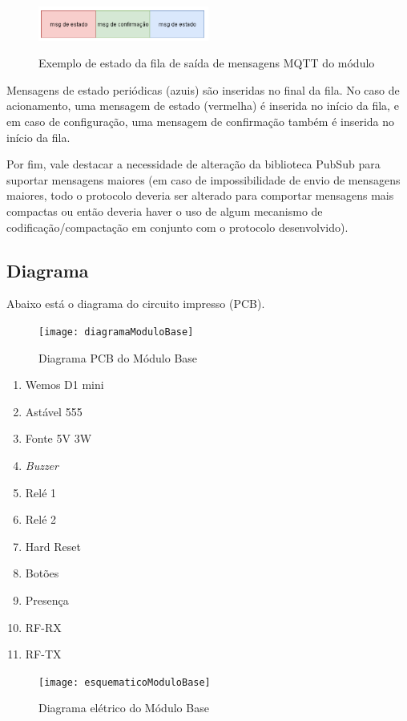 \begin{figure}[H]
	\centering
	\caption{Exemplo de estado da fila de saída de mensagens MQTT do módulo}
	\includegraphics[width=0.5\textwidth]{filasaidaMQTT}
	\label{fig:filasaidaMQTT}
\end{figure}

Mensagens de estado periódicas (azuis) são inseridas no final da fila.
No caso de acionamento, uma mensagem de estado (vermelha) é inserida no início da fila, e em caso de configuração, uma mensagem de confirmação também é inserida no início da fila.

Por fim, vale destacar a necessidade de alteração da biblioteca PubSub para suportar mensagens maiores (em caso de impossibilidade de envio de mensagens maiores, todo o protocolo deveria ser alterado para comportar mensagens mais compactas ou então deveria haver o uso de algum mecanismo de codificação/compactação em conjunto com o protocolo desenvolvido).

\subsection{Diagrama}
Abaixo está o diagrama do circuito impresso (PCB).

\begin{figure}[H]
	\centering
	\caption{Diagrama PCB do Módulo Base}
  \texttt{[image: diagramaModuloBase]}
\label{fig:diagramaModuloBase}
\end{figure}

\begin{enumerate}
\item Wemos D1 mini
\item Astável 555
\item Fonte 5V 3W
\item \textit{Buzzer}
\item Relé 1
\item Relé 2
\item Hard Reset
\item Botões
\item Presença
\item RF-RX
\item RF-TX
\end{enumerate}

\begin{figure}[H]
	\centering
	\caption{Diagrama elétrico do Módulo Base}
  \texttt{[image: esquematicoModuloBase]}
\label{fig:esquematicoModuloBase}
\end{figure}

